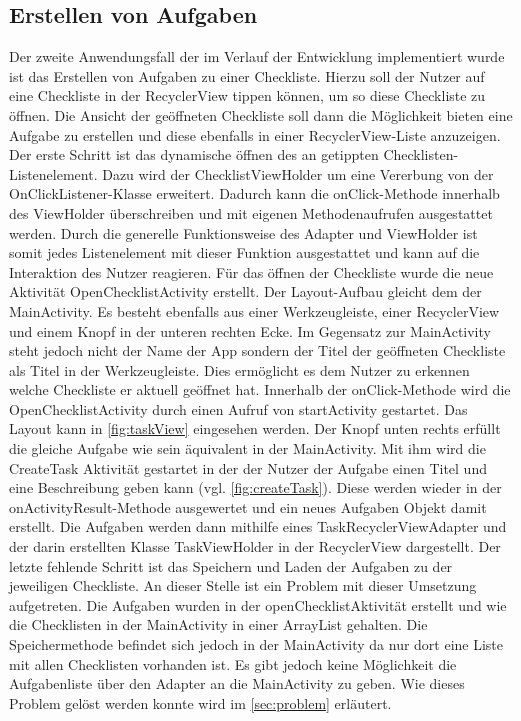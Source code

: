 \subsection{Erstellen von Aufgaben}\label{subsec:erstelleAufgaben}

Der zweite Anwendungsfall der im Verlauf der Entwicklung implementiert wurde ist das Erstellen von Aufgaben zu einer Checkliste. Hierzu soll der Nutzer auf eine Checkliste in der RecyclerView tippen können, um so diese Checkliste zu öffnen. Die Ansicht der geöffneten Checkliste soll dann die Möglichkeit bieten eine Aufgabe zu erstellen und diese ebenfalls in einer RecyclerView-Liste anzuzeigen.\\
Der erste Schritt ist das dynamische öffnen des an getippten Checklisten-Listenelement. Dazu wird der ChecklistViewHolder um eine Vererbung von der OnClickListener-Klasse erweitert. Dadurch kann die onClick-Methode innerhalb des ViewHolder überschreiben und mit eigenen Methodenaufrufen ausgestattet werden. Durch die generelle Funktionsweise des Adapter und ViewHolder ist somit jedes Listenelement mit dieser Funktion ausgestattet und kann auf die Interaktion des Nutzer reagieren. Für das öffnen der Checkliste wurde die neue Aktivität OpenChecklistActivity erstellt. Der Layout-Aufbau gleicht dem der MainActivity. Es besteht ebenfalls aus einer Werkzeugleiste, einer RecyclerView und einem Knopf in der unteren rechten Ecke. Im Gegensatz zur MainActivity steht jedoch nicht der Name der App sondern der Titel der geöffneten Checkliste als Titel in der Werkzeugleiste. Dies ermöglicht es dem Nutzer zu erkennen welche Checkliste er aktuell geöffnet hat. Innerhalb der onClick-Methode wird die OpenChecklistActivity durch einen Aufruf von startActivity gestartet. Das Layout kann in \autoref{fig:taskView} eingesehen werden. Der Knopf unten rechts erfüllt die gleiche Aufgabe wie sein äquivalent in der MainActivity. Mit ihm wird die CreateTask Aktivität gestartet in der der Nutzer der Aufgabe einen Titel und eine Beschreibung geben kann (vgl. \autoref{fig:createTask}). Diese werden wieder in der onActivityResult-Methode ausgewertet und ein neues Aufgaben Objekt damit erstellt. Die Aufgaben werden dann mithilfe eines TaskRecyclerViewAdapter und der darin erstellten Klasse TaskViewHolder in der RecyclerView dargestellt. Der letzte fehlende Schritt ist das Speichern und Laden der Aufgaben zu der jeweiligen Checkliste. An dieser Stelle ist ein Problem mit dieser Umsetzung aufgetreten. Die Aufgaben wurden in der openChecklistAktivität erstellt und wie die Checklisten in der MainActivity in einer ArrayList gehalten. Die Speichermethode befindet sich jedoch in der MainActivity da nur dort eine Liste mit allen Checklisten vorhanden ist. Es gibt jedoch keine Möglichkeit die Aufgabenliste über den Adapter an die MainActivity zu geben. Wie dieses Problem gelöst werden konnte wird im \autoref{sec:problem} erläutert.
